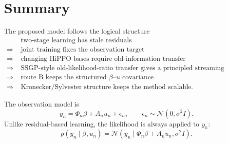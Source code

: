 \documentclass[12pt]{article}
\begin{document}
\section{Summary}
\label{sec:summary}

The proposed model follows the logical structure
\begin{equation}
\begin{aligned}
    &\text{two-stage learning has stale residuals} \\
    \Rightarrow\;&
    \text{joint training fixes the observation target} \\
    \Rightarrow\;&
    \text{changing HiPPO bases require old-information transfer} \\
    \Rightarrow\;&
    \text{SSGP-style old-likelihood-ratio transfer gives a principled streaming update} \\
    \Rightarrow\;&
    \text{route B keeps the structured }\beta\text{--}u\text{ covariance} \\
    \Rightarrow\;&
    \text{Kronecker/Sylvester structure keeps the method scalable.}
\end{aligned}
\end{equation}

The observation model is
\begin{equation}
    y_n=\Phi_n\beta+A_nu_n+\epsilon_n,
    \qquad
    \epsilon_n\sim\mathcal{N}(0,\sigma^2I).
\end{equation}
Unlike residual-based learning, the likelihood is always applied to $y_n$:
\begin{equation}
    p(y_n\mid \beta,u_n)
    =
    \mathcal{N}(y_n\mid \Phi_n\beta+A_nu_n,\sigma^2I).
\end{equation}
\end{document}
